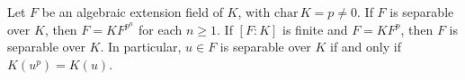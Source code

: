 Let $F$ be an algebraic extension field of $K$, with $\mathrm{char}\,K = p \neq 0$. If $F$ is separable over $K$, then $F = KF^{p^n}$ for each $n \geq 1$. If $[F : K]$ is finite and $F = KF^p$, then $F$ is separable over $K$. In particular, $u \in F$ is separable over $K$ if and only if $K(u^p) = K(u)$.
